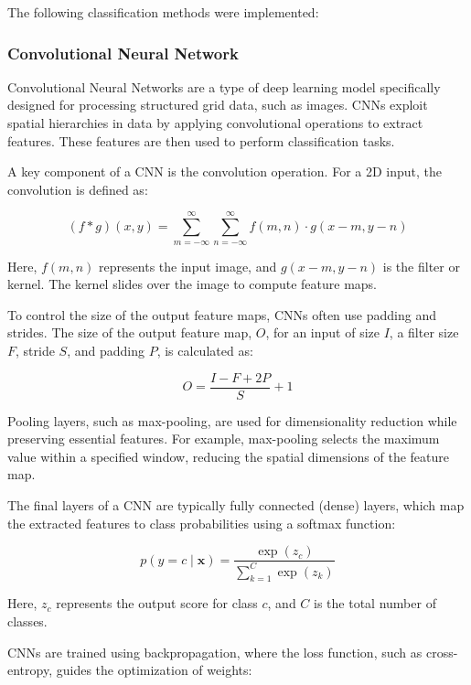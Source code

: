 The following classification methods were implemented:

\subsubsection{Convolutional Neural Network}

Convolutional Neural Networks are a type of deep learning model specifically designed for processing structured grid data, such as images. CNNs exploit spatial hierarchies in data by applying convolutional operations to extract features. These features are then used to perform classification tasks.

A key component of a CNN is the convolution operation. For a 2D input, the convolution is defined as:

\begin{equation}
    (f * g)(x, y) = \sum_{m=-\infty}^{\infty} \sum_{n=-\infty}^{\infty} f(m, n) \cdot g(x - m, y - n)
\end{equation}

Here, \(f(m, n)\) represents the input image, and \(g(x - m, y - n)\) is the filter or kernel. The kernel slides over the image to compute feature maps.

To control the size of the output feature maps, CNNs often use padding and strides. The size of the output feature map, \(O\), for an input of size \(I\), a filter size \(F\), stride \(S\), and padding \(P\), is calculated as:

\begin{equation}
    O = \frac{I - F + 2P}{S} + 1
\end{equation}

Pooling layers, such as max-pooling, are used for dimensionality reduction while preserving essential features. For example, max-pooling selects the maximum value within a specified window, reducing the spatial dimensions of the feature map.

The final layers of a CNN are typically fully connected (dense) layers, which map the extracted features to class probabilities using a softmax function:

\begin{equation}
    p(y = c \mid \boldsymbol{x}) = \frac{\exp(z_c)}{\sum_{k=1}^C \exp(z_k)}
\end{equation}

Here, \(z_c\) represents the output score for class \(c\), and \(C\) is the total number of classes.

CNNs are trained using backpropagation, where the loss function, such as cross-entropy, guides the optimization of weights:

